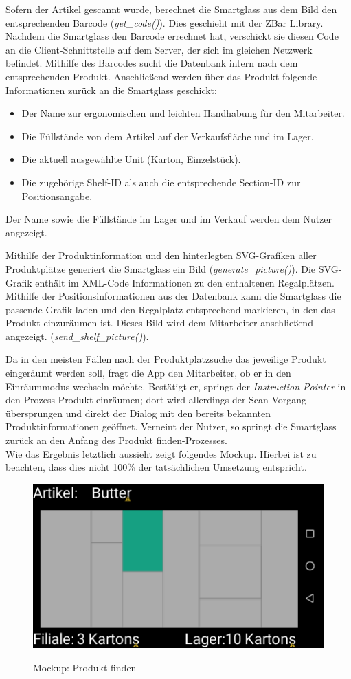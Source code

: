 Sofern der Artikel gescannt wurde, berechnet die Smartglass aus dem Bild den entsprechenden Barcode (\emph{get\_code()}). Dies geschieht mit der ZBar Library. Nachdem die Smartglass den Barcode errechnet hat, verschickt sie diesen Code an die Client-Schnittstelle auf dem Server, der sich im gleichen Netzwerk befindet. Mithilfe des Barcodes sucht die Datenbank intern nach dem entsprechenden Produkt. Anschließend werden über das Produkt folgende Informationen zurück an die Smartglass geschickt:
\begin{itemize}
	\item Der Name zur ergonomischen und leichten Handhabung für den Mitarbeiter.
	\item Die Füllstände von dem Artikel auf der Verkaufsfläche und im  Lager.
	\item Die aktuell ausgewählte Unit (Karton, Einzelstück).
	\item Die zugehörige Shelf-ID als auch die entsprechende Section-ID zur Positionsangabe.
\end{itemize}
Der Name sowie die Füllstände im Lager und im Verkauf werden dem Nutzer angezeigt.

Mithilfe der Produktinformation und den hinterlegten \acs{SVG}-Grafiken aller Produktplätze generiert die Smartglass ein Bild (\emph{generate\_picture()}). Die \acs{SVG}-Grafik enthält im \acs{XML}-Code Informationen zu den enthaltenen Regalplätzen. Mithilfe der Positionsinformationen aus der Datenbank kann die Smartglass die passende Grafik laden und den Regalplatz entsprechend markieren, in den das Produkt einzuräumen ist. Dieses Bild wird dem Mitarbeiter anschließend angezeigt. (\emph{send\_shelf\_picture()}).

Da in den meisten Fällen nach der Produktplatzsuche das jeweilige Produkt eingeräumt werden soll, fragt die App den Mitarbeiter, ob er in den Einräummodus wechseln möchte.
Bestätigt er, springt der \textit{Instruction Pointer} in den Prozess \glqq Produkt einräumen\grqq ; dort wird allerdings der Scan-Vorgang übersprungen und direkt der Dialog mit den bereits bekannten Produktinformationen geöffnet. Verneint der Nutzer, so springt die Smartglass zurück an den Anfang des \glqq Produkt finden\grqq -Prozesses. \\
Wie das Ergebnis letztlich aussieht zeigt folgendes Mockup. Hierbei ist zu beachten, dass dies nicht 100\% der tatsächlichen Umsetzung entspricht. 
\begin{figure}[H]
	\centering
	{\includegraphics[scale=0.7]{Bilder/Abbildungen/produkt_finden_mockup.png}}
	\caption{Mockup: Produkt finden}
	\label{fig:jwt_encode}
\end{figure}

